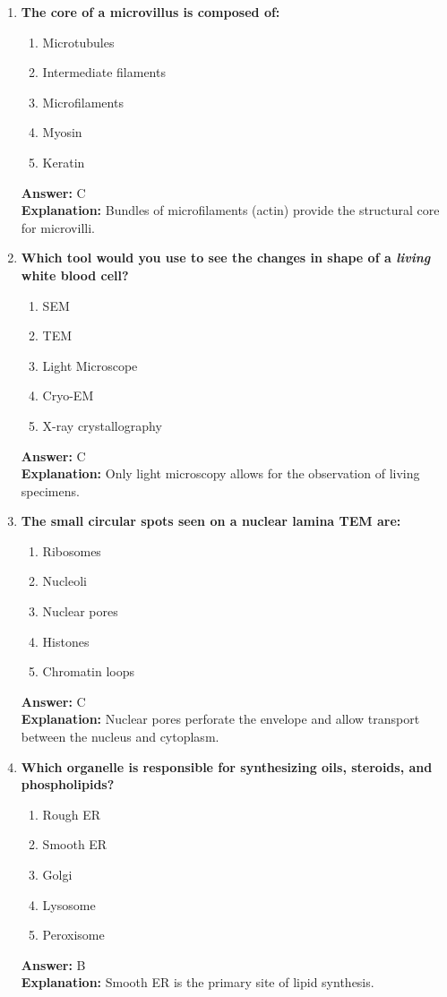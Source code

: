 \documentclass[11pt, a4paper]{article}
\begin{document}
\begin{enumerate}[leftmargin=*, label=\arabic*.]
\item \textbf{The core of a microvillus is composed of:}
\begin{enumerate}[label=\Alph*.]
\item Microtubules
\item Intermediate filaments
\item Microfilaments
\item Myosin
\item Keratin
\end{enumerate}
\textbf{Answer:} C \\
\textbf{Explanation:} Bundles of microfilaments (actin) provide the structural core for microvilli.

\item \textbf{Which tool would you use to see the changes in shape of a \textit{living} white blood cell?}
\begin{enumerate}[label=\Alph*.]
\item SEM
\item TEM
\item Light Microscope
\item Cryo-EM
\item X-ray crystallography
\end{enumerate}
\textbf{Answer:} C \\
\textbf{Explanation:} Only light microscopy allows for the observation of living specimens.

\item \textbf{The small circular spots seen on a nuclear lamina TEM are:}
\begin{enumerate}[label=\Alph*.]
\item Ribosomes
\item Nucleoli
\item Nuclear pores
\item Histones
\item Chromatin loops
\end{enumerate}
\textbf{Answer:} C \\
\textbf{Explanation:} Nuclear pores perforate the envelope and allow transport between the nucleus and cytoplasm.

\item \textbf{Which organelle is responsible for synthesizing oils, steroids, and phospholipids?}
\begin{enumerate}[label=\Alph*.]
\item Rough ER
\item Smooth ER
\item Golgi
\item Lysosome
\item Peroxisome
\end{enumerate}
\textbf{Answer:} B \\
\textbf{Explanation:} Smooth ER is the primary site of lipid synthesis.


\end{enumerate}
\end{document}
